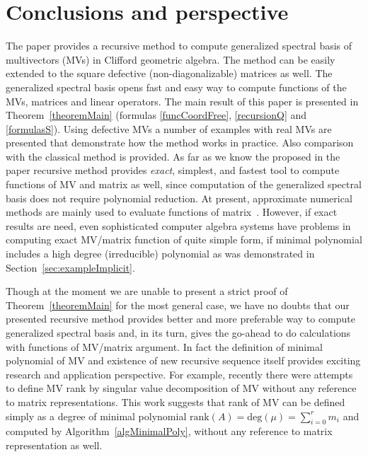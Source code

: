 \documentclass[AMA,STIX1COL]{WileyNJD-v2}
\begin{document}
\section{Conclusions and perspective}
\label{sec:discussion}

The paper provides a recursive method to compute generalized spectral basis of multivectors (MVs) in Clifford geometric
 algebra.  The method can be easily extended to the square defective (non-diagonalizable) matrices as well.
 The generalized spectral basis opens fast and easy way to compute functions of the MVs, matrices and linear operators.
 The main result of this paper is presented in Theorem~\ref{theoremMain} (formulas
 \eqref{funcCoordFree}, \eqref{recursionQ} and \eqref{formulasS}). Using  defective MVs a number of examples with real MVs
 are presented that demonstrate  how the method works  in practice. Also comparison with the classical method is provided.
 As far as we know the proposed in the paper recursive method provides \textit{exact}, simplest,  and fastest  tool
 to compute functions of MV and matrix as well, since  computation of the generalized
 spectral  basis does not require polynomial reduction. At present, approximate numerical
 methods are mainly used to evaluate functions of matrix~\cite{Higham2008}.  However, if exact results are need,
 even sophisticated computer  algebra systems  have problems in computing exact MV/matrix function of quite simple form,
 if minimal polynomial includes  a high degree (irreducible) polynomial as was demonstrated in Section~\ref{sec:exampleImplicit}. 
 

Though at the moment we are unable to present a strict proof of Theorem~\ref{theoremMain} for the  most general case, we have no doubts that
 our presented recursive method provides better and more preferable way to compute generalized spectral basis and, in its turn,
 gives the go-ahead to do calculations with  functions of MV/matrix argument. In fact the definition of minimal polynomial of MV and  existence of new
recursive sequence itself provides exciting research and application perspective. For example, recently there were attempts~\cite{ShirokovSVG2024,ShirokovRank2024} to define MV rank by singular value decomposition of MV without any reference to matrix representations. 
This work suggests that rank of MV can be defined simply as a degree of minimal polynomial $\textrm{rank}(A)=\mathrm{deg}(\mu)=\sum_{i=0}^r m_i$ and computed by Algorithm~\ref{algMinimalPoly}, without any reference to matrix representation as well. 
\end{document}
